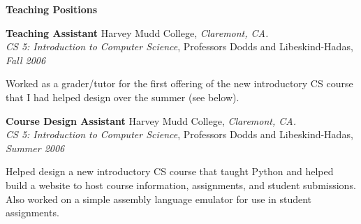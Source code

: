 \documentclass[11pt]{article}
\newenvironment{sct}[1]{%
  \vspace{8pt plus 2pt minus 4pt}\textbf{\Large #1} \hrulefill\vspace{6pt}
  \begin{adjustwidth}{6pt}{0pt}
}{%
  \end{adjustwidth}
}
\newcommand{\indented}[1]{\hspace*{\fill}\parbox{\textwidth-22pt}{#1}}
\newcommand{\teachingexperience}[7]{%
  \textbf{#1} #2, \textit{#3.} \\
  \textit{#4}, #5, \textit{#6} \\
  \indented{#7}
  \vspace{7pt plus 2pt minus 2pt}
}
\begin{document}
\begin{sct}{Teaching Positions}
\teachingexperience{Teaching Assistant}{Harvey Mudd College}{Claremont, CA}%
{CS 5: Introduction to Computer Science}{Professors Dodds and Libeskind-Hadas}{Fall 2006}%
{Worked as a grader/tutor for the first offering of the new introductory
CS course that I had helped design over the summer (see below).}

\teachingexperience{Course Design Assistant}{Harvey Mudd College}{Claremont, CA}%
{CS 5: Introduction to Computer Science}{Professors Dodds and Libeskind-Hadas}{Summer 2006}%
{Helped design a new introductory CS course that taught Python and
helped build a website to host course information, assignments, and
student submissions. Also worked on a simple assembly language emulator
for use in student assignments.}

\end{sct}
\end{document}
